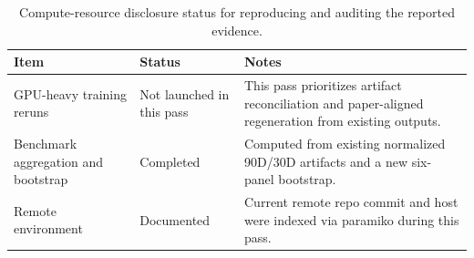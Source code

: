 \begin{table}[t]
\centering
\caption{Compute-resource disclosure status for reproducing and auditing the reported evidence.}
\label{tab:table_26_compute_disclosure}
\begin{tabular}{lll}
\toprule
Item & Status & Notes \\
\midrule
GPU-heavy training reruns & Not launched in this pass & This pass prioritizes artifact reconciliation and paper-aligned regeneration from existing outputs. \\
Benchmark aggregation and bootstrap & Completed & Computed from existing normalized 90D/30D artifacts and a new six-panel bootstrap. \\
Remote environment & Documented & Current remote repo commit and host were indexed via paramiko during this pass. \\
\bottomrule
\end{tabular}
\end{table}
